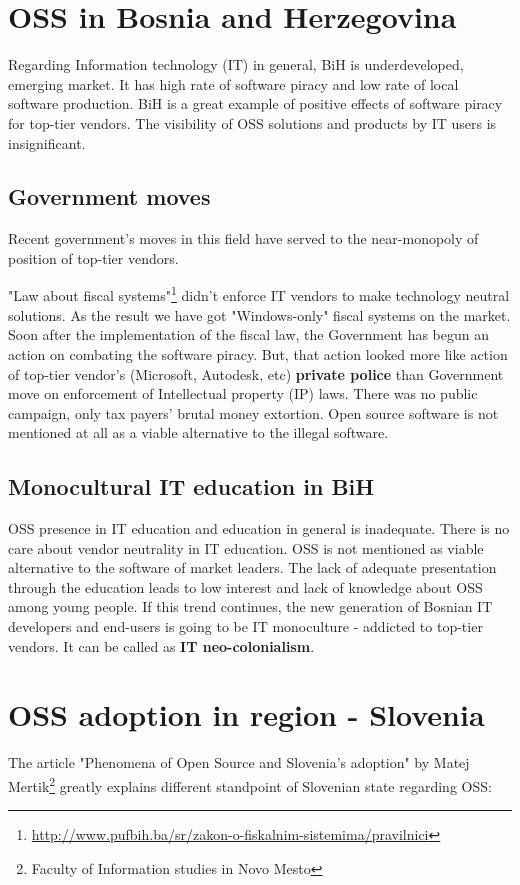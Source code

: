 \documentclass[times, utf8, seminar]{fit}
\begin{document}
\chapter{OSS in Bosnia and Herzegovina}

Regarding Information technology (IT) in general, BiH is underdeveloped, emerging market. It has high rate of software piracy and low rate of local software production. BiH is a great example of positive effects of software piracy for top-tier vendors. The visibility of OSS solutions and products by IT users is insignificant.

\section{Government moves}
Recent government’s moves in this field have served to the near-monopoly of position of top-tier vendors. 

"Law about fiscal systems"\footnote{\url{http://www.pufbih.ba/sr/zakon-o-fiskalnim-sistemima/pravilnici}} didn't enforce IT vendors to make technology neutral solutions. As the result we have got "Windows-only" fiscal systems on the market. Soon after the implementation of the fiscal law, the Government has begun an action on combating the software piracy. But, that action looked more like action of top-tier vendor's (Microsoft, Autodesk, etc) \textbf{private police} than Government move on enforcement of Intellectual property (IP) laws. There was no public campaign, only tax payers’ brutal money extortion. Open source software is not mentioned at all as a viable alternative to the illegal software.

\section{Monocultural IT education in BiH}
OSS presence in IT education and education in general is inadequate. There is no care about vendor neutrality in IT education. OSS is not mentioned as viable alternative to the software of market leaders. The lack of adequate presentation through the education leads to low interest and lack of knowledge about OSS among young people. If this trend continues, the new generation of Bosnian IT developers and end-users is going to be IT monoculture - addicted to top-tier vendors. It can be called as \textbf{IT neo-colonialism}.

\chapter{OSS adoption in region - Slovenia} 
The article "Phenomena of Open Source and Slovenia's adoption" by Matej Mertik\footnote{Faculty of Information studies in Novo Mesto} greatly explains different standpoint of Slovenian state regarding OSS:
  
\end{document}

